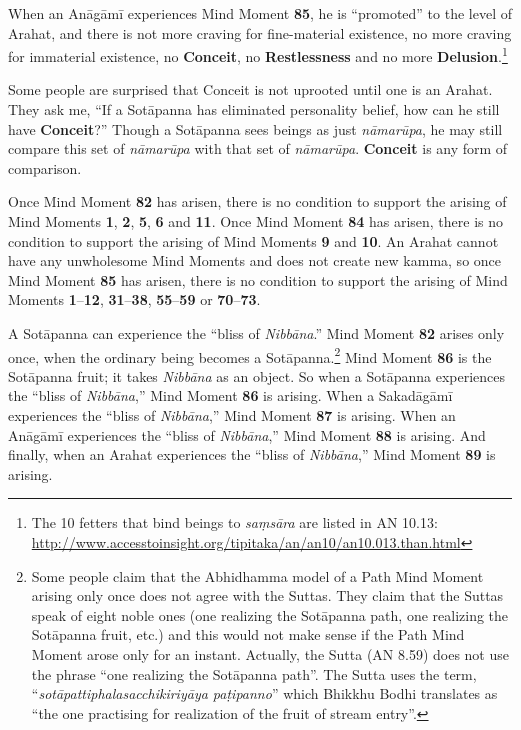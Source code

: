 When an Anāgāmī experiences Mind Moment \textbf{85}, he is “promoted” to the level of Arahat, and there is not more craving for fine-material existence, no more craving for immaterial existence, no \textbf{Conceit}, no \textbf{Restlessness} and no more \textbf{Delusion}.\footnote{The 10 fetters that bind beings to \textit{saṃsāra} are listed in AN 10.13: \url{http://www.accesstoinsight.org/tipitaka/an/an10/an10.013.than.html}}

Some people are surprised that Conceit is not uprooted until one is an Arahat. They ask me, “If a Sotāpanna has eliminated personality belief, how can he still have \textbf{Conceit}?” Though a Sotāpanna sees beings as just \textit{nāmarūpa}, he may still compare this set of \textit{nāmarūpa} with that set of \textit{nāmarūpa}. \textbf{Conceit} is any form of comparison.

Once Mind Moment \textbf{82} has arisen, there is no condition to support the arising of Mind Moments \textbf{1}, \textbf{2}, \textbf{5}, \textbf{6} and \textbf{11}. Once Mind Moment \textbf{84} has arisen, there is no condition to support the arising of Mind Moments \textbf{9} and \textbf{10}. An Arahat cannot have any unwholesome Mind Moments and does not create new kamma, so once Mind Moment \textbf{85} has arisen, there is no condition to support the arising of Mind Moments \textbf{1}--\textbf{12}, \textbf{31}--\textbf{38}, \textbf{55}--\textbf{59} or \textbf{70}--\textbf{73}.

A Sotāpanna can experience the “bliss of \textit{Nibbāna}.” Mind Moment \textbf{82} arises only once, when the ordinary being becomes a Sotāpanna.\footnote{ Some people claim that the Abhidhamma model of a Path Mind Moment arising only once does not agree with the Suttas. They claim that the Suttas speak of eight noble ones (one realizing the Sotāpanna path, one realizing the Sotāpanna fruit, etc.) and this would not make sense if the Path Mind Moment arose only for an instant. Actually, the Sutta (AN 8.59) does not use the phrase “one realizing the Sotāpanna path”. The Sutta uses the term, “\textit{sotāpattiphalasacchikiriyāya paṭipanno}” which Bhikkhu Bodhi translates as “the one practising for realization of the fruit of stream entry”.} Mind Moment \textbf{86} is the Sotāpanna fruit; it takes \textit{Nibbāna} as an object. So when a Sotāpanna experiences the “bliss of \textit{Nibbāna},” Mind Moment \textbf{86} is arising. When a Sakadāgāmī experiences the “bliss of \textit{Nibbāna},” Mind Moment \textbf{87} is arising. When an Anāgāmī experiences the “bliss of \textit{Nibbāna},” Mind Moment \textbf{88} is arising. And finally, when an Arahat experiences the “bliss of \textit{Nibbāna},” Mind Moment \textbf{89} is arising. 

